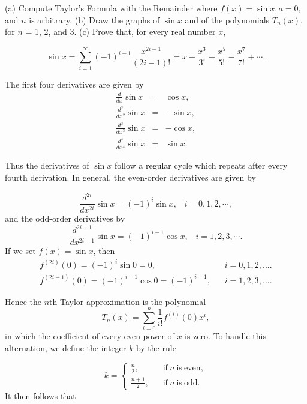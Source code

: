 \begin{example}
(a) Compute Taylor's Formula with the Remainder where $f(x) = \sin x, a = 0$, and $n$ is arbitrary. (b) Draw the graphs of $\sin x$ and of the polynomials $T_n(x)$, for $n$ = 1, 2, and 3. (c) Prove that, for every real number $x$, 

$$
\sin x = \sum_{i=1}^\infty (-1)^{i-1} \frac{x^{2i-1}}{(2i - 1)!} = x - \frac{x^3}{3!} + \frac{x^5}{5!} - \frac{x^7}{7!} + \cdots .
$$

The first four derivatives are given by
\begin{eqnarray*}
\frac{d}{dx} \sin x &=& \cos x, \\
\frac{d^2}{dx^2} \sin x &=& -\sin x, \\
\frac{d^3}{dx^3} \sin x &=& -\cos x,\\
\frac{d^4}{dx^4} \sin x &=& \sin x.
\end{eqnarray*}

\noindent Thus the derivatives of $\sin x$ follow a regular cycle which repeats after every fourth derivation. In general, the even-order derivatives are given by

$$
\frac{d^{2i}}{dx^{2i}} \sin x = (-1)^i \sin x, \;\;\; i= 0, 1,2,\cdots , 
$$
\noindent and the odd-order derivatives by
$$
\frac{d^{2i-1}}{dx^{2i-1}} \sin x = (-1)^{i-1} \cos x, \;\;\; i = 1, 2, 3, \cdots .
$$
\noindent If we set $f(x) = \sin x$, then 
$$
\begin{array}{ll}
f^{(2i)}(0) = (-1)^i \sin 0 = 0,                     & \;\;\; i = 0, 1, 2, .... \\
f^{(2i-1)}(0) = (-1)^{i-1} \cos 0 = (-1)^{i-1},& \;\;\; i = 1, 2, 3, .... 
\end{array}
$$

\noindent Hence the $n$th Taylor approximation is the polynomial
$$
T_n(x) = \sum_{i=0}^n \frac{1}{i!} f^{(i)} (0)x^i,
$$
\noindent in which the coefficient of every even power of $x$ is zero. To handle this alternation, we define the integer $k$ by the rule

\begin{equation}
k = \left \{ \begin{array}{ll}
\frac{n}{2}, \;\;\;       &\mathrm{if}~n~\mathrm{is~even,} \\
\frac{n + 1}{2}, \;\;\; &\mathrm{if}~n~\mathrm{is~odd.} 
\end{array}
\right .
\label{eq9.8.4}
\end{equation} 
\noindent It then follows that 


\end{example}
